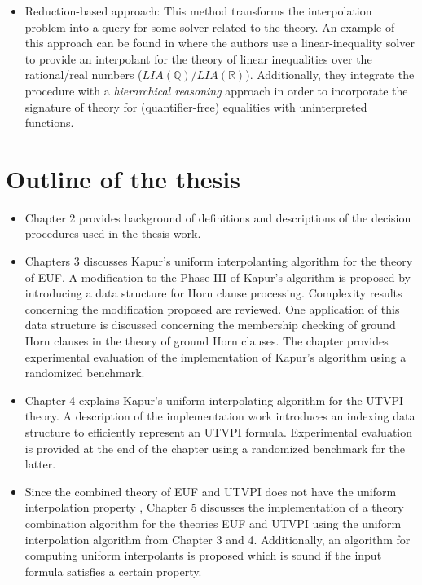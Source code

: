 \begin{itemize}
  \item Reduction-based approach: This method transforms the interpolation
    problem into a query for some solver related to the theory. 
    An example of this approach can be found in \cite{10.1007/978-3-540-69738-1_25}
    where the authors use a linear-inequality solver to provide an interpolant
    for the theory of linear inequalities over the rational/real numbers 
    ($LIA(\mathbb{Q})/LIA(\mathbb{R})$). 
    Additionally, they integrate the procedure with a 
    \emph{hierarchical reasoning} approach in order to incorporate 
    the signature of theory for (quantifier-free) equalities with uninterpreted 
    functions.
\end{itemize}

\section{Outline of the thesis}

\begin{itemize}
  \item Chapter 2 provides background 
    of definitions and descriptions of the
    decision procedures 
    used in the thesis work.
  \item Chapters 3 discusses Kapur's uniform 
    interpolanting algorithm for the theory of EUF.
    A modification to the Phase III of 
    Kapur's algorithm is proposed by introducing a 
    data structure for Horn clause processing. 
    Complexity results concerning the modification 
    proposed are reviewed. 
    One application of this data structure
    is discussed concerning the membership 
    checking of ground 
    Horn clauses in the theory of ground Horn clauses.
    The chapter provides experimental evaluation
    of the implementation of Kapur's algorithm 
    using a randomized benchmark.
  \item Chapter 4 explains Kapur's uniform interpolating
    algorithm for the UTVPI theory. A description 
    of the implementation work introduces an indexing
    data structure to efficiently represent an UTVPI
    formula. Experimental evaluation is provided at 
    the end of the chapter using a randomized 
    benchmark for the latter. 
  \item Since the combined theory of EUF and UTVPI
    does not have the uniform interpolation property 
    \cite{10.1007/978-3-030-51074-9_11},
    Chapter 5 discusses the implementation of
    a theory combination algorithm for the theories
    EUF and UTVPI using the uniform 
    interpolation algorithm from Chapter 3 and 4. 
    Additionally, an algorithm for computing 
    uniform interpolants
    is proposed which is sound if the input 
    formula satisfies a certain property.

\end{itemize} 

